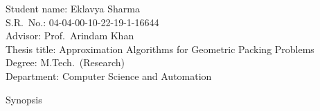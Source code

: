\documentclass[oneside,12pt,fleqn]{IIScthesisPSnPDF}
\begin{document}
\noindent Student name: Eklavya Sharma
\\\noindent S.R.~No.: 04-04-00-10-22-19-1-16644
\\\noindent Advisor: Prof.~Arindam Khan
\\\noindent Thesis title: Approximation Algorithms for Geometric Packing Problems
\\\noindent Degree: M.Tech.~(Research)
\\\noindent Department: Computer Science and Automation
\vspace{1cm}

{\Huge\bfseries\begin{center}Synopsis\end{center}}
\vspace{1cm}


\end{document}
